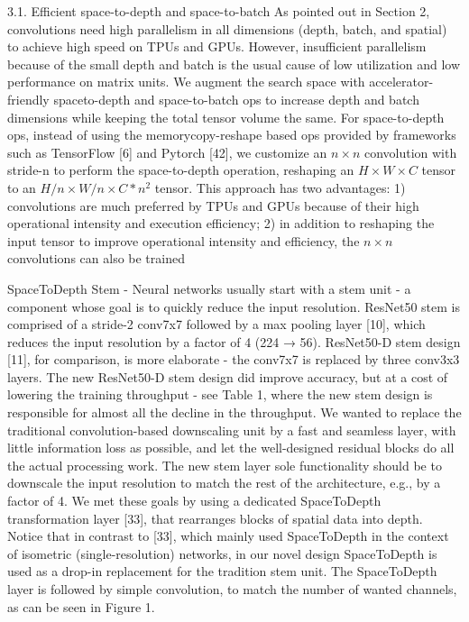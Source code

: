 3.1. Efficient space-to-depth and space-to-batch
As pointed out in Section 2, convolutions need high parallelism in all dimensions (depth, batch, and spatial) to achieve high speed on TPUs and GPUs. However, insufficient parallelism because of the small depth and batch is the usual cause of low utilization and low performance on matrix units. We augment the search space with accelerator-friendly spaceto-depth and space-to-batch ops to increase depth and batch dimensions while keeping the total tensor volume the same. For space-to-depth ops, instead of using the memorycopy-reshape based ops provided by frameworks such as TensorFlow [6] and Pytorch [42], we customize an $n \times n$ convolution with stride-n to perform the space-to-depth operation, reshaping an $H \times W \times C$ tensor to an $H / n \times W / n \times C * n^{2}$ tensor. This approach has two advantages: 1) convolutions are much preferred by TPUs and GPUs because of their high operational intensity and execution efficiency; 2) in addition to reshaping the input tensor to improve operational intensity and efficiency, the $n \times n$ convolutions can also be trained
 
SpaceToDepth Stem - Neural networks usually start
with a stem unit - a component whose goal is to quickly
reduce the input resolution. ResNet50 stem is comprised
of a stride-2 conv7x7 followed by a max pooling layer
[10], which reduces the input resolution by a factor of 4
(224 → 56). ResNet50-D stem design [11], for comparison, is more elaborate - the conv7x7 is replaced by three
conv3x3 layers. The new ResNet50-D stem design did
improve accuracy, but at a cost of lowering the training
throughput - see Table 1, where the new stem design is responsible for almost all the decline in the throughput.
We wanted to replace the traditional convolution-based
downscaling unit by a fast and seamless layer, with little information loss as possible, and let the well-designed residual blocks do all the actual processing work. The new stem
layer sole functionality should be to downscale the input
resolution to match the rest of the architecture, e.g., by a
factor of 4. We met these goals by using a dedicated SpaceToDepth transformation layer [33], that rearranges blocks
of spatial data into depth. Notice that in contrast to [33],
which mainly used SpaceToDepth in the context of isometric (single-resolution) networks, in our novel design SpaceToDepth is used as a drop-in replacement for the tradition
stem unit. The SpaceToDepth layer is followed by simple
convolution, to match the number of wanted channels, as
can be seen in Figure 1.